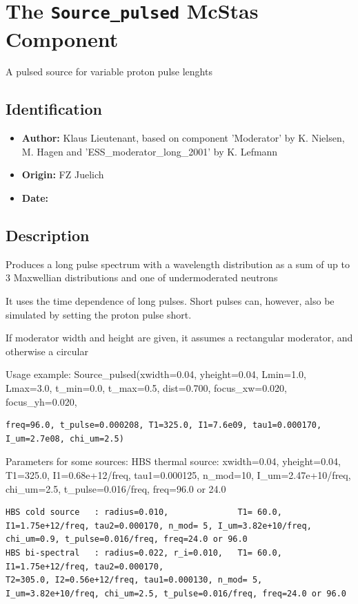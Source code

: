 \section{The \texttt{Source\_pulsed} McStas Component}
A pulsed source for variable proton pulse lenghts

\subsection*{Identification}
\begin{itemize}
  \item \textbf{Author:} Klaus Lieutenant, based on component 'Moderator' by K. Nielsen, M. Hagen and 'ESS\_moderator\_long\_2001' by K. Lefmann
  \item \textbf{Origin:} FZ Juelich
  \item \textbf{Date:} 
\end{itemize}

\subsection*{Description}
Produces a long pulse spectrum with a wavelength distribution as a sum of up to 3 Maxwellian distributions and one of undermoderated neutrons

It uses the time dependence of long pulses. Short pulses can, however, also be simulated by setting the proton pulse short.

If moderator width and height are given, it assumes a rectangular moderator, and otherwise a circular

Usage example: Source\_pulsed(xwidth=0.04, yheight=0.04, Lmin=1.0, Lmax=3.0, t\_min=0.0, t\_max=0.5, dist=0.700, focus\_xw=0.020, focus\_yh=0.020,

\begin{verbatim}
freq=96.0, t_pulse=0.000208, T1=325.0, I1=7.6e09, tau1=0.000170, I_um=2.7e08, chi_um=2.5)
\end{verbatim}

Parameters for some sources: HBS thermal source: xwidth=0.04, yheight=0.04, T1=325.0, I1=0.68e+12/freq, tau1=0.000125, n\_mod=10, I\_um=2.47e+10/freq, chi\_um=2.5, t\_pulse=0.016/freq, freq=96.0 or 24.0

\begin{verbatim}
HBS cold source   : radius=0.010,              T1= 60.0, I1=1.75e+12/freq, tau2=0.000170, n_mod= 5, I_um=3.82e+10/freq, chi_um=0.9, t_pulse=0.016/freq, freq=24.0 or 96.0
HBS bi-spectral   : radius=0.022, r_i=0.010,   T1= 60.0, I1=1.75e+12/freq, tau2=0.000170,
T2=305.0, I2=0.56e+12/freq, tau1=0.000130, n_mod= 5, I_um=3.82e+10/freq, chi_um=2.5, t_pulse=0.016/freq, freq=24.0 or 96.0
\end{verbatim}

